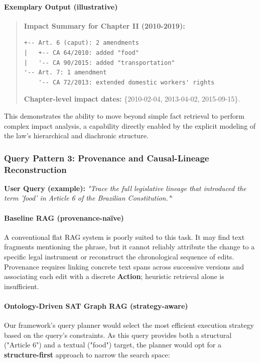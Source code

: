 \documentclass[11pt]{article}
\begin{document}
\paragraph{Exemplary Output (illustrative)}
\begin{quote}\small
\textbf{Impact Summary for Chapter II (2010-2019):}
\begin{verbatim}
+-- Art. 6 (caput): 2 amendments
|   +-- CA 64/2010: added "food"
|   '-- CA 90/2015: added "transportation"
'-- Art. 7: 1 amendment
    '-- CA 72/2013: extended domestic workers' rights
\end{verbatim}
\textbf{Chapter-level impact dates:} \{2010-02-04, 2013-04-02, 2015-09-15\}.
\end{quote}
This demonstrates the ability to move beyond simple fact retrieval to perform complex impact analysis, a capability directly enabled by the explicit modeling of the law's hierarchical and diachronic structure.

\subsubsection*{Query Pattern 3: Provenance and Causal-Lineage Reconstruction}
\textbf{User Query (example):} \textit{"Trace the full legislative lineage that introduced the term 'food' in Article 6 of the Brazilian Constitution."}`
\paragraph{Baseline RAG (provenance-naïve)}
A conventional flat RAG system is poorly suited to this task. It may find text fragments mentioning the phrase, but it cannot reliably attribute the change to a specific legal instrument or reconstruct the chronological sequence of edits. Provenance requires linking concrete text spans across successive versions and associating each edit with a discrete \textbf{Action}; heuristic retrieval alone is insufficient.

\paragraph{Ontology-Driven SAT Graph RAG (strategy-aware)}
Our framework's query planner would select the most efficient execution strategy based on the query's constraints. As this query provides both a structural ("Article 6") and a textual ("food") target, the planner would opt for a \textbf{structure-first} approach to narrow the search space:
\end{document}
